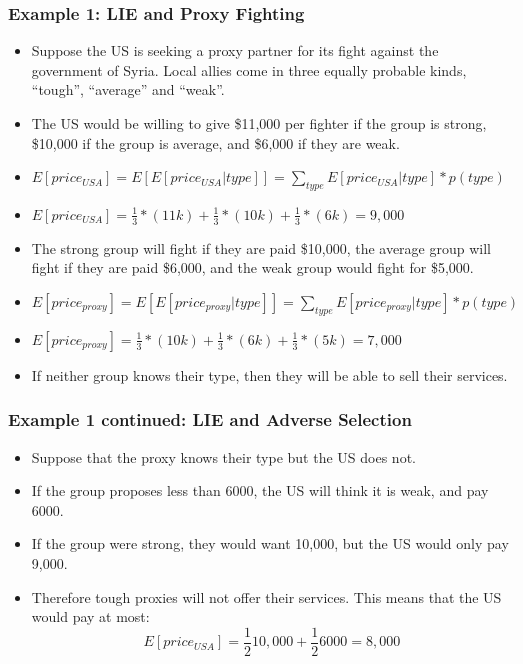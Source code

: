 \documentclass{beamer}
\numberwithin{equation}{section}
\begin{document}
\begin{frame}
\frametitle{Example 1: LIE and Proxy Fighting}
\begin{itemize}
\item  Suppose the US is seeking a proxy partner for its fight against the government of Syria.  Local allies come in three equally probable kinds, ``tough'', ``average'' and ``weak''.
\item The US would be willing to give \$11,000 per fighter if the group is strong, \$10,000 if the group is average, and \$6,000 if they are weak.\pause
\item $E[price_{USA}]=E[E[price_{USA}|type]]=\sum_{type}E[price_{USA}|type]*p(type)$\pause
\item $E[price_{USA}]=\frac{1}{3}*(11k)+\frac{1}{3}*(10k)+\frac{1}{3}*(6k)=9,000$\pause
\item The strong group will fight if they are paid \$10,000, the average group will fight if they are paid \$6,000, and the weak group would fight for \$5,000.\pause
\item $E[price_{proxy}]=E[E[price_{proxy}|type]]=\sum_{type}E[price_{proxy}|type]*p(type)$\pause
\item $E[price_{proxy}]=\frac{1}{3}*(10k)+\frac{1}{3}*(6k)+\frac{1}{3}*(5k)=7,000$\pause
\item If neither group knows their type, then they will be able to sell their services.
\end{itemize}
\end{frame}

\begin{frame}
\frametitle{Example 1 continued: LIE and Adverse Selection}
\begin{itemize}
\item  Suppose that the proxy knows their type but the US does not.\pause
\item If the group proposes less than 6000, the US will think it is weak, and pay 6000.\pause
\item If the group were strong, they would want 10,000, but the US would only pay 9,000.\pause
\item Therefore tough proxies will not offer their services.  This means that the US would pay at most:
$$E[price_{USA}]=\frac{1}{2}10,000+\frac{1}{2}6000=8,000$$
\end{itemize}
\end{frame}
\end{document}
